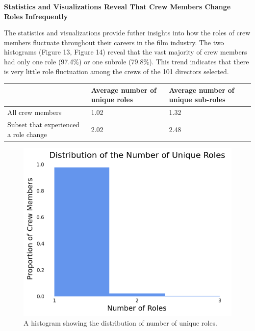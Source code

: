 \documentclass[12pt]{article}
\begin{document}
\textbf{Statistics and Visualizations Reveal That Crew Members Change Roles Infrequently}

The statistics and visualizations provide futher insights into how the roles of crew members fluctuate throughout their careers in the film industry. The two histograms (Figure 13, Figure 14) reveal that the vast majority of crew members had only one role (97.4\%) or one subrole (79.8\%). This trend indicates that there is very little role fluctuation among the crews of the 101 directors selected.

\begin{table}[H]
\centering
\begin{tabular}{|p{3cm}|p{5cm}|p{5cm}|}
\hline
 & Average number of unique roles & Average number of unique sub-roles \\ \hline
All crew members & 1.02 & 1.32 \\ \hline
Subset that experienced a role change & 2.02 & 2.48 \\ \hline
\end{tabular}
\end{table}

\begin{figure}[H]
    \centering
    \includegraphics[clip,scale=0.7] {2_histnumroles.png}
    \caption{A histogram showing the distribution of number of unique roles.}
    \label{fig:sankey}
\end{figure}
\end{document}
